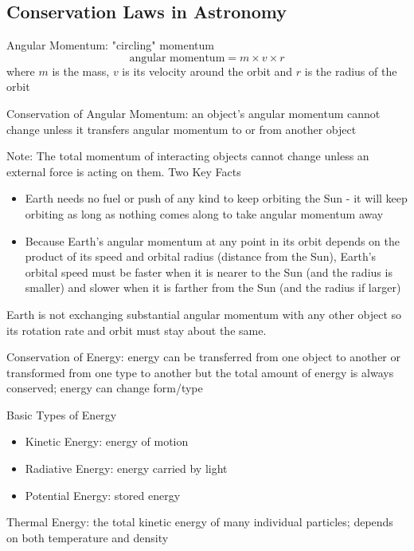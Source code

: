 \documentclass[12pt]{article}
\begin{document}
\subsection{Conservation Laws in Astronomy} 
\begin{definition} Angular Momentum: "circling" momentum $$\text{angular momentum} = m \times v \times r $$ where $m$ is the mass, $v$ is its velocity around the orbit and $r$ is the radius of the orbit \end{definition} 
\begin{definition} Conservation of Angular Momentum: an object's angular momentum cannot change unless it transfers angular momentum to or from another object \end{definition} 
Note: The total momentum of interacting objects cannot change unless an external force is acting on them. \newpage
Two Key Facts \begin{itemize}
\item Earth needs no fuel or push of any kind to keep orbiting the Sun - it will keep orbiting as long as nothing comes along to take angular momentum away 
\item Because Earth's angular momentum at any point in its orbit depends on the product of its speed and orbital radius (distance from the Sun), Earth's orbital speed must be faster when it is nearer to the Sun (and the radius is smaller) and slower when it is farther from the Sun (and the radius if larger) \end{itemize} 
Earth is not exchanging substantial angular momentum with any other object so its rotation rate and orbit must stay about the same. 
\begin{definition} Conservation of Energy: energy can be transferred from one object to another or transformed from one type to another but the total amount of energy is always conserved; energy can change form/type \end{definition} 
\begin{definition} Basic Types of Energy \begin{itemize}
\item Kinetic Energy: energy of motion
\item Radiative Energy: energy carried by light 
\item Potential Energy: stored energy \end{itemize} \end{definition} 
\begin{definition} Thermal Energy: the total kinetic energy of many individual particles; depends on both temperature and density \end{definition} 
\end{document}
